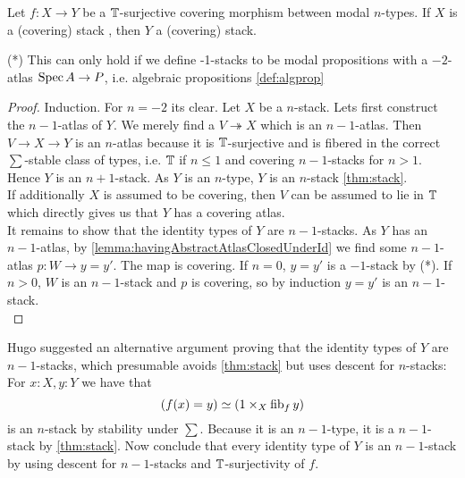 \documentclass{article}
\begin{document}
\begin{theorem}{\label{thm:quotients}}
	Let $f : X \to Y$ be a $\mathbb{T}$-surjective covering morphism between modal $n$-types. If $X$ is a (covering) stack , then $Y$ a  (covering) stack.
\end{theorem}
(*) This can only hold if we define -1-stacks to be  modal propositions with a $-2$-atlas $\operatorname{Spec} A \to P$, i.e. algebraic propositions \ref{def:algprop} %
\begin{proof}
	Induction.
	For $n = -2$ its clear.
	Let $X$ be a  $n$-stack. Lets first construct the $n-1$-atlas of $Y$.
	We merely find a $V \twoheadrightarrow X$ which is an $n-1$-atlas.  Then $V \to X \to Y$ is an $n$-atlas because it is $\mathbb{T}$-surjective and is fibered in the correct $\sum$-stable class of types, i.e. $\mathbb{T}$ if $n \le 1$ and  covering $n-1$-stacks for $n > 1$. Hence $Y$ is an $n+1$-stack. As $Y$ is an $n$-type, $Y$ is an $n$-stack \ref{thm:stack}. \\
	If additionally $X$ is assumed to be covering, then $V$ can be assumed to lie in $\mathbb{T}$ which directly gives us that $Y$ has a covering atlas. \\
	It remains to show that the identity types of $Y$ are  $n-1$-stacks. As $Y$ has an $n-1$-atlas, by \ref{lemma:havingAbstractAtlasClosedUnderId} we  find some $n-1$-atlas $p : W \to y=y'$. The map is covering. %
	If $n=0$, $y = y'$ is a $-1$-stack by (*). If $n > 0$, $W$ is an $n-1$-stack and $p$ is covering, so by induction $y = y'$ is an $n-1$-stack. \\

	
	
\end{proof}
\begin{rmk}
		Hugo suggested an alternative argument proving that the identity types of $Y$ are $n-1$-stacks, which presumable avoids \ref{thm:stack} but uses descent for $n$-stacks: 
	For $x : X, y: Y$ we have that 
	\[
	(f(x) = y) \simeq (1 \times_X \operatorname{fib}_f y)
	\]
	is an $n$-stack by stability under $\sum$. Because it is an $n-1$-type, it is a $n-1$-stack by \ref{thm:stack}. Now conclude that every identity type of $Y$ is an $n-1$-stack by using descent for $n-1$-stacks and $\mathbb{T}$-surjectivity of $f$.
\end{rmk}
\end{document}
